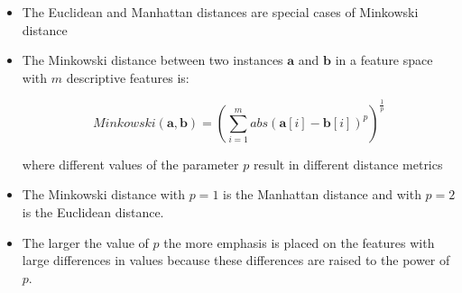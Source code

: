 \documentclass[xcolor={table}]{beamer}
\begin{document}
\begin{frame} 
\begin{itemize}
\item The Euclidean and Manhattan distances are special cases of \alert{Minkowski distance}
\item The \alert{Minkowski distance} between two instances $\textbf{a}$ and $\textbf{b}$ in a feature space with $m$ descriptive features is:

\begin{equation}
Minkowski(\textbf{a},\textbf{b}) = \left(\sum_{i=1}^{m} abs(\textbf{a}[i] - \textbf{b}[i])^{p}\right)^{\frac{1}{p}}
\label{eq:mink}
\end{equation}

where different values of the parameter $p$ result in different distance metrics
\item The Minkowski distance with $p=1$ is the Manhattan distance and with $p=2$ is the Euclidean distance.
\end{itemize}
\end{frame} 


\begin{frame} 
	\begin{itemize}
		\item The larger the value of $p$ the more emphasis is placed on the features with large differences in values because these differences are raised to the power of $p$. 
	\end{itemize}
\end{frame} 
\end{document}
